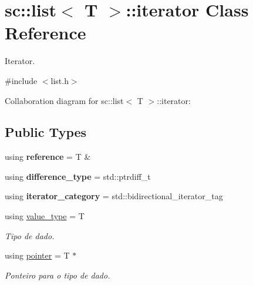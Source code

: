 \hypertarget{classsc_1_1list_1_1iterator}{}\section{sc\+:\+:list$<$ T $>$\+:\+:iterator Class Reference}
\label{classsc_1_1list_1_1iterator}


Iterator.  




{\ttfamily \#include $<$list.\+h$>$}



Collaboration diagram for sc\+:\+:list$<$ T $>$\+:\+:iterator\+:
\subsection*{Public Types}
\begin{DoxyCompactItemize}
\item 
\mbox{\label{classsc_1_1list_1_1iterator_af129e3c7d5ec8db6bdf6d5fab7d8cb02}} 
using {\bfseries reference} = T \&
\item 
\mbox{\label{classsc_1_1list_1_1iterator_a36d0809808331ca636e2bd8d6e261f5a}} 
using {\bfseries difference\+\_\+type} = std\+::ptrdiff\+\_\+t
\item 
\mbox{\label{classsc_1_1list_1_1iterator_acc4db8147f70e8e8a940ba0f24bf81de}} 
using {\bfseries iterator\+\_\+category} = std\+::bidirectional\+\_\+iterator\+\_\+tag
\item 
\mbox{\label{classsc_1_1list_1_1iterator_a163e81ef81bcd38779b49d50b2f697c0}} 
using \hyperlink{classsc_1_1list_1_1iterator_a163e81ef81bcd38779b49d50b2f697c0}{value\+\_\+type} = T
\begin{DoxyCompactList}\small\item\em Tipo de dado. \end{DoxyCompactList}\item 
\mbox{\label{classsc_1_1list_1_1iterator_af4d0fd9da7a49ba326b36c39b95a70b9}} 
using \hyperlink{classsc_1_1list_1_1iterator_af4d0fd9da7a49ba326b36c39b95a70b9}{pointer} = T $\ast$
\begin{DoxyCompactList}\small\item\em Ponteiro para o tipo de dado. \end{DoxyCompactList}\end{DoxyCompactItemize}
